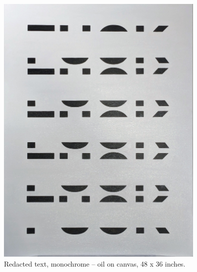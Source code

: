 \documentclass[12pt]{article}
\begin{document}
\newpage
\begin{figure}[htbp]
  \centering
  \includegraphics*[width=0.9\textwidth]{black.jpg}
  \caption{Redacted text, monochrome -- oil on canvas, 48 x 36 inches.}
  \label{fig:black}
\end{figure}
\end{document}
